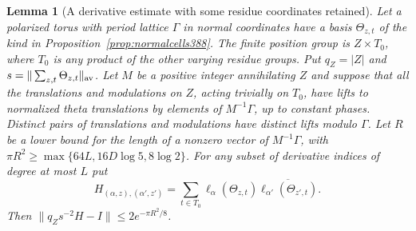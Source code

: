 \documentclass[a4paper,11pt]{article}
\newtheorem{lemma}[proposition]{Lemma}
\theoremstyle{definition}
\theoremstyle{remark}
\numberwithin{equation}{section}
\begin{document}
\begin{lemma}[A derivative estimate with some residue coordinates retained]
\label{lem:partialtheta390}
Let a polarized torus with period lattice \(\Gamma\) in normal
coordinates have a basis \(\Theta_{z,t}\) of the kind in
Proposition~\ref{prop:normalcells388}. The finite position group
is \(Z\times T_0\), where \(T_0\) is any product of the other
varying residue groups. Put \(q_Z=|Z|\) and
\(s=\|\sum_{z,t}\Theta_{z,t}\|_{\rm av}\). Let \(M\) be a
positive integer annihilating \(Z\) and suppose that all the
translations and modulations on \(Z\), acting trivially on
\(T_0\), have lifts to normalized theta translations by
elements of \(M^{-1}\Gamma\), up to constant phases. Distinct
pairs of translations and modulations have distinct lifts
modulo \(\Gamma\). Let \(R\) be a lower bound for the length of
a nonzero vector of \(M^{-1}\Gamma\), with
\(\pi R^2\ge\max\{64L,16D\log5,8\log2\}\).
For any subset of derivative indices of degree at most \(L\) put
\[
  H_{(\alpha,z),(\alpha',z')}
      =\sum_{t\in T_0}\ell_\alpha(\Theta_{z,t})
                              \overline{\ell_{\alpha'}(\Theta_{z',t})}.
\]
Then \(\|q_Zs^{-2}H-I\|\le2e^{-\pi R^2/8}\).
\end{lemma}
\end{document}
